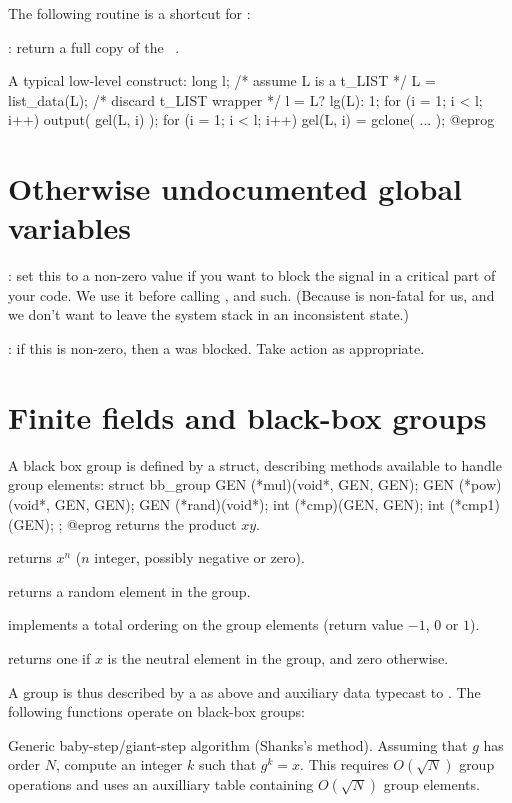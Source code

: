 The following routine is a shortcut for :

: return a full copy of the ~.

A typical low-level construct:
\bprog
  long l;
  /* assume L is a t_LIST */
  L = list_data(L); /* discard t_LIST wrapper */
  l = L? lg(L): 1;
  for (i = 1; i < l; i++) output( gel(L, i) );
  for (i = 1; i < l; i++) gel(L, i) = gclone( ... );
@eprog\noindent

\section{Otherwise undocumented global variables}

: set this to a non-zero value if you want to block
the  signal in a critical part of your code. We use it
before calling ,  and such. (Because 
is non-fatal for us, and we don't want to leave the system stack in an
inconsistent state.)

: if this is non-zero, then a  was
blocked. Take action as appropriate.

\section{Finite fields and black-box groups}

A black box group is defined by a  struct, describing methods
available to handle group elements:
\bprog
    struct bb_group
    {
      GEN (*mul)(void*, GEN, GEN);
      GEN (*pow)(void*, GEN, GEN);
      GEN (*rand)(void*);
      int (*cmp)(GEN, GEN);
      int (*cmp1)(GEN);
    };
@eprog
 returns the product $xy$.

 returns $x^n$ ($n$ integer, possibly negative or zero).

 returns a random element in the group.

 implements a total ordering on the group elements
(return value $-1$, $0$ or $1$).

 returns one if $x$ is the neutral element in the group,
and zero otherwise.

A group is thus described by a  as above and auxiliary
data typecast to . The following functions operate on black-box
groups:

 Generic baby-step/giant-step algorithm
(Shanks's method). Assuming that $g$ has order $N$, compute an integer $k$
such that $g^k = x$. This requires $O(\sqrt{N})$ group operations and uses an
auxilliary table containing $O(\sqrt{N})$ group elements.

